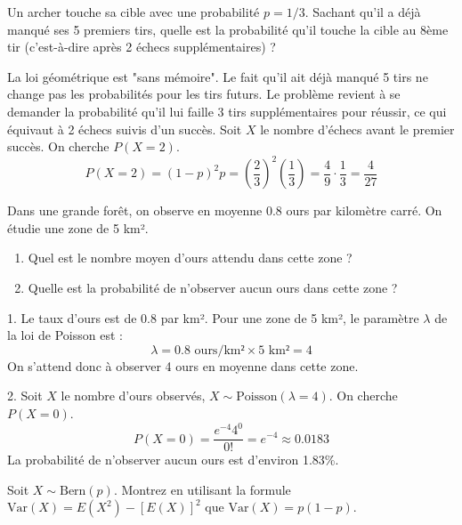 \begin{exercicebox}
Un archer touche sa cible avec une probabilité $p=1/3$. Sachant qu'il a déjà manqué ses 5 premiers tirs, quelle est la probabilité qu'il touche la cible au 8ème tir (c'est-à-dire après 2 échecs supplémentaires) ?
\end{exercicebox}

\begin{correctionbox}
La loi géométrique est "sans mémoire". Le fait qu'il ait déjà manqué 5 tirs ne change pas les probabilités pour les tirs futurs. Le problème revient à se demander la probabilité qu'il lui faille 3 tirs supplémentaires pour réussir, ce qui équivaut à 2 échecs suivis d'un succès.
Soit $X$ le nombre d'échecs avant le premier succès. On cherche $P(X=2)$.
$$ P(X=2) = (1-p)^2 p = \left(\frac{2}{3}\right)^2 \left(\frac{1}{3}\right) = \frac{4}{9} \cdot \frac{1}{3} = \frac{4}{27} $$
\end{correctionbox}

\begin{exercicebox}
Dans une grande forêt, on observe en moyenne 0.8 ours par kilomètre carré. On étudie une zone de 5 km².
\begin{enumerate}
    \item Quel est le nombre moyen d'ours attendu dans cette zone ?
    \item Quelle est la probabilité de n'observer aucun ours dans cette zone ?
\end{enumerate}
\end{exercicebox}

\begin{correctionbox}
1. Le taux d'ours est de 0.8 par km². Pour une zone de 5 km², le paramètre $\lambda$ de la loi de Poisson est :
$$ \lambda = 0.8 \text{ ours/km²} \times 5 \text{ km²} = 4 $$
On s'attend donc à observer 4 ours en moyenne dans cette zone.

2. Soit $X$ le nombre d'ours observés, $X \sim \text{Poisson}(\lambda=4)$. On cherche $P(X=0)$.
$$ P(X=0) = \frac{e^{-4} 4^0}{0!} = e^{-4} \approx 0.0183 $$
La probabilité de n'observer aucun ours est d'environ 1.83\%.
\end{correctionbox}

\begin{exercicebox}
Soit $X \sim \text{Bern}(p)$. Montrez en utilisant la formule $\text{Var}(X) = E(X^2) - [E(X)]^2$ que $\text{Var}(X) = p(1-p)$.
\end{exercicebox}

